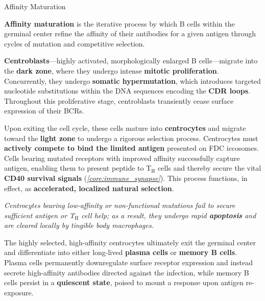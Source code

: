       \begin{core}[label=core:affinity_maturation]{Affinity Maturation}

        \textbf{Affinity maturation} is the iterative process by which B cells within the germinal center refine the affinity of their antibodies for a given antigen through cycles of mutation and competitive selection.

        \textbf{Centroblasts}---highly activated, morphologically enlarged B cells---migrate into the \textbf{dark zone}, where they undergo intense \textbf{mitotic proliferation}. Concurrently, they undergo \textbf{somatic hypermutation}, which introduces targeted nucleotide substitutions within the DNA sequences encoding the \textbf{CDR loops}. Throughout this proliferative stage, centroblasts transiently cease surface expression of their BCRs.

        Upon exiting the cell cycle, these cells mature into \textbf{centrocytes} and migrate toward the \textbf{light zone} to undergo a rigorous selection process. Centrocytes must \textbf{actively compete to bind the limited antigen} presented on FDC iccosomes. Cells bearing mutated receptors with improved affinity successfully capture antigen, enabling them to present peptide to T$_\text{H}$ cells and thereby secure the vital \textbf{CD40 survival signals} (\textit{\autoref{core:immune_synapse}}). This process functions, in effect, as \textbf{accelerated, localized natural selection}.

        \textit{Centrocytes bearing low-affinity or non-functional mutations fail to secure sufficient antigen or T$_\text{H}$ cell help; as a result, they undergo rapid \textbf{apoptosis} and are cleared locally by tingible body macrophages.}


        The highly selected, high-affinity centrocytes ultimately exit the germinal center and differentiate into either long-lived \textbf{plasma cells} or \textbf{memory B cells}. Plasma cells permanently downregulate surface receptor expression and instead secrete high-affinity antibodies directed against the infection, while memory B cells persist in a \textbf{quiescent state}, poised to mount a response upon antigen re-exposure.

      \end{core}

